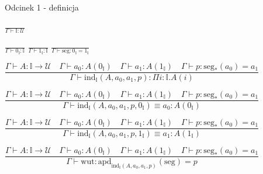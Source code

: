 \documentclass{beamer}
\newcommand{\U}{\mathcal{U}}
\newcommand{\apd}[2]{\text{apd}_{#1}(#2)}
\newcommand{\I}{\mathbb{I}}
\newcommand{\IZ}{0_\mathbb{I}}
\newcommand{\II}{1_\mathbb{I}}
\newcommand{\seg}{\text{seg}}
\begin{document}
\begin{frame}{Odcinek 1 - definicja}

\begin{center}
$\displaystyle
	\frac{}{\Gamma \vdash \I : \U}
$
\end{center}

\begin{center}
$\displaystyle
	\frac{}{\Gamma \vdash \IZ : \I}
$ \quad
$\displaystyle
	\frac{}{\Gamma \vdash \II : \I}
$ \quad
$\displaystyle
	\frac{}{\Gamma \vdash \seg : \IZ = \II}
$
\end{center}

\begin{center}
$\displaystyle
	\dfrac{\Gamma \vdash A   : \I \to \U			\quad
		  \Gamma \vdash a_0 : A(\IZ)			\quad
		  \Gamma \vdash a_1 : A(\II)			\quad
		  \Gamma \vdash p   : \seg_*(a_0) = a_1
		 }
		 {\Gamma \vdash \text{ind}_\I(A, a_0, a_1, p) : \Pi i : \I. A(i)}
$
\end{center}

\begin{center}
$\displaystyle
	\dfrac{\Gamma \vdash A   : \I \to \U			\quad
		  \Gamma \vdash a_0 : A(\IZ)			\quad
		  \Gamma \vdash a_1 : A(\II)			\quad
		  \Gamma \vdash p   : \seg_*(a_0) = a_1
		 }
		 {\Gamma \vdash \text{ind}_\I(A, a_0, a_1, p, \IZ) \equiv a_0 : A(\IZ)}
$
\end{center}

\begin{center}
$\displaystyle
	\dfrac{\Gamma \vdash A   : \I \to \U			\quad
		  \Gamma \vdash a_0 : A(\IZ)			\quad
		  \Gamma \vdash a_1 : A(\II)			\quad
		  \Gamma \vdash p   : \seg_*(a_0) = a_1
		 }
		 {\Gamma \vdash \text{ind}_\I(A, a_0, a_1, p, \II) \equiv a_1 : A(\II)}
$
\end{center}

\begin{center}
$\displaystyle
	\dfrac{\Gamma \vdash A   : \I \to \U			\quad
		  \Gamma \vdash a_0 : A(\IZ)			\quad
		  \Gamma \vdash a_1 : A(\II)			\quad
		  \Gamma \vdash p   : \seg_*(a_0) = a_1
		 }
		 {\Gamma \vdash \text{wut} : \apd{\text{ind}_\I(A, a_0, a_1, p)}{\seg} = p}
$
\end{center}

\end{frame}
\end{document}
